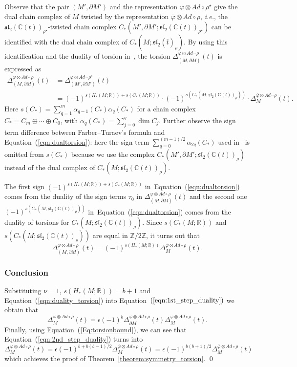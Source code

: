 \documentclass[a4paper]{amsart}
\theoremstyle{plain}
\theoremstyle{definition}
\theoremstyle{remark}
\newcommand{\ie}{\emph{i.e.}}
\newcommand{\ZZ}{{\mathbb Z}}
\newcommand{\CC}{{\mathbb C}}
\newcommand{\IR}{{\mathbb R}}
\newcommand{\sllt}{\mathfrak{sl}_2(\CC(t))}
\newcommand{\sllrhot}{\mathfrak{sl}_2(\CC(t))_\rho}
\newcommand{\msllrho}[1]{\mathfrak{sl}_2(#1)_\rho}
\newcommand{\PolyTors}[2]{\Delta_{#1}^{#2}}
\newcommand{\otAd}[2]{#1 \otimes Ad \circ #2}
\newcommand{\bord}{\partial}
\begin{document}
Observe that the pair $(M', \bord M')$ and the representation
$\otAd{\varphi}{{\rho}^{\star}}$ give the dual chain complex
of $M$ twisted by the representation $\otAd{\overline{\varphi}}{\rho}$, \ie, the
$\sllt_{{\rho}^{\star}}$-twisted chain complex $C_*(M', \bord
M';\sllt_{{\rho}^{\star}})$ can be identified with the dual chain complex of
$C_*(M;\msllrho{\overline{t}})$.  By using this identification and the
duality of torsion in~\cite{FarberTuraev:PR_metric}, the torsion
$\PolyTors{(M, \bord M)}{\otAd{\varphi}{\rho}}(t)$ is expressed as
\begin{align}\label{eqn:dualtorsion}
  \PolyTors{(M, \bord M)}{\otAd{\varphi}{\rho}}(t) &=
  \PolyTors{(M', \bord M')}{\otAd{\varphi}{{\rho}^{\star}}}(t) \nonumber \\
  &=
  (-1)^{s(H_*(M;\IR))+s(C_*(M;\IR))}\cdot(-1)^{s(C_*(M;\sllrhot))}\cdot
  \PolyTors{M}{\otAd{\overline{\varphi}}{\rho}}(t).
\end{align}
Here $s(C_*) = \sum_{q=1}^m \alpha_{q-1}(C_*)\alpha_q(C_*)$ for a chain
complex $C_*=C_m\oplus \cdots \oplus C_0$, with
$\alpha_q(C_*)=\sum_{j=0}^q\dim C_j$.  Further observe the sign term
difference between Farber--Turaev's formula and
Equation~(\ref{eqn:dualtorsion}): here the sign term
$\sum_{q=0}^{(m-1)/2}\alpha_{2q}(C_*)$ used
in~\cite{FarberTuraev:PR_metric} is omitted from $s(C_*)$ because we use
the complex $C_*(M', \bord M';\sllrhot)$ instead of the dual complex
of $C_*(M;\sllrhot)$.

The first sign $(-1)^{s(H_*(M;\IR))+s(C_*(M;\IR))}$
in~Equation~(\ref{eqn:dualtorsion}) comes from the duality of the sign
terms $\tau_0$ in $\PolyTors{(M, \bord M)}{\otAd{\varphi}{\rho}}(t)$
and the second one $(-1)^{s(C_*(M;\sllrhot))}$
in~Equation~(\ref{eqn:dualtorsion}) comes from the duality of torsions for
$C_*(M; \sllrhot)$.  Since $s(C_*(M;\IR))$ and $s(C_*(M;\sllrhot))$
are equal in $\ZZ/2\ZZ$, it turns out that
\begin{equation}\label{eqn:duality_torsion}
  \PolyTors{(M, \bord M)}{\otAd{\varphi}{\rho}}(t)
  =
  (-1)^{s(H_*(M;\IR))}
  \PolyTors{M}{\otAd{\overline{\varphi}}{\rho}}(t).
\end{equation}

\subsubsection{Conclusion}
Substituting $\nu =1$, $s(H_*(M;\IR)) = b+1$ and
Equation~(\ref{eqn:duality_torsion}) into
Equation~$(\ref{eqn:1st_step_duality})$ we obtain that
\begin{equation}\label{eqn:2nd_step_duality}
  \PolyTors{M}{\otAd{\varphi}{\rho}}(t)
  =\epsilon (-1)^{b}
  \PolyTors{\bord M}{\otAd{\varphi}{\rho}}(t)
  \PolyTors{M}{\otAd{\overline{\varphi}}{\rho}}(t).
\end{equation}
Finally, using
Equation~(\ref{Eq:torsionbound}),
we can see that Equation~(\ref{eqn:2nd_step_duality}) turns into
$$
\PolyTors{M}{\otAd{\varphi}{\rho}}(t)
=\epsilon (-1)^{b+b(b-1)/2}
\PolyTors{M}{\otAd{\overline{\varphi}}{\rho}}(t)
=\epsilon (-1)^{b(b+1)/2}
\PolyTors{M}{\otAd{\overline{\varphi}}{\rho}}(t)
$$
which achieves the proof of Theorem~\ref{theorem:symmetry_torsion}.
\qed
\end{document}
